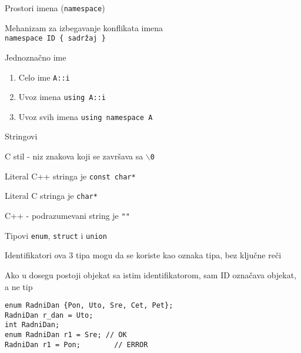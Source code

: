 \documentclass{article}
\newenvironment{xitemize}{%
    
    \itemize
    \larger
}{%
    \enditemize
}
\let\olditemize\itemize
\let\endolditemize\enditemize
\renewenvironment{itemize}{%
    \smaller
    \olditemize
}{%
    \endolditemize
}
\providecommand{\inlinecode}[1]{\texttt{#1}}
\begin{document}
\begin{xitemize}
\item Prostori imena (\inlinecode{namespace})
\begin{itemize}
    \item Mehanizam za izbegavanje konflikata imena\\
    \inlinecode{namespace ID \{ sadržaj \}}
    \item Jednoznačno ime
    \begin{enumerate}
        \item Celo ime \inlinecode{A::i}
        \item Uvoz imena \inlinecode{using A::i}
        \item Uvoz svih imena \inlinecode{using namespace A}
    \end{enumerate}
\end{itemize}
\item Stringovi
\begin{itemize}
    \item C stil - niz znakova koji se završava sa \inlinecode{$\backslash$0}
    \item Literal C++ stringa je \inlinecode{const char*}
    \item Literal C stringa je \inlinecode{char*}
    \item C++ - podrazumevani string je \inlinecode{""}
\end{itemize}
\item Tipovi \inlinecode{enum}, \inlinecode{struct} i \inlinecode{union}
\begin{itemize}
    \item Identifikatori ova 3 tipa mogu da se koriste kao oznaka tipa, bez ključne reči
    \item Ako u dosegu postoji objekat sa istim identifikatorom, sam ID označava objekat, a ne tip
    \begin{lstlisting}
enum RadniDan {Pon, Uto, Sre, Cet, Pet};
RadniDan r_dan = Uto;
int RadniDan;
enum RadniDan r1 = Sre; // OK
RadniDan r1 = Pon;        // ERROR
    \end{lstlisting}
\end{itemize}



\end{xitemize}
\end{document}
